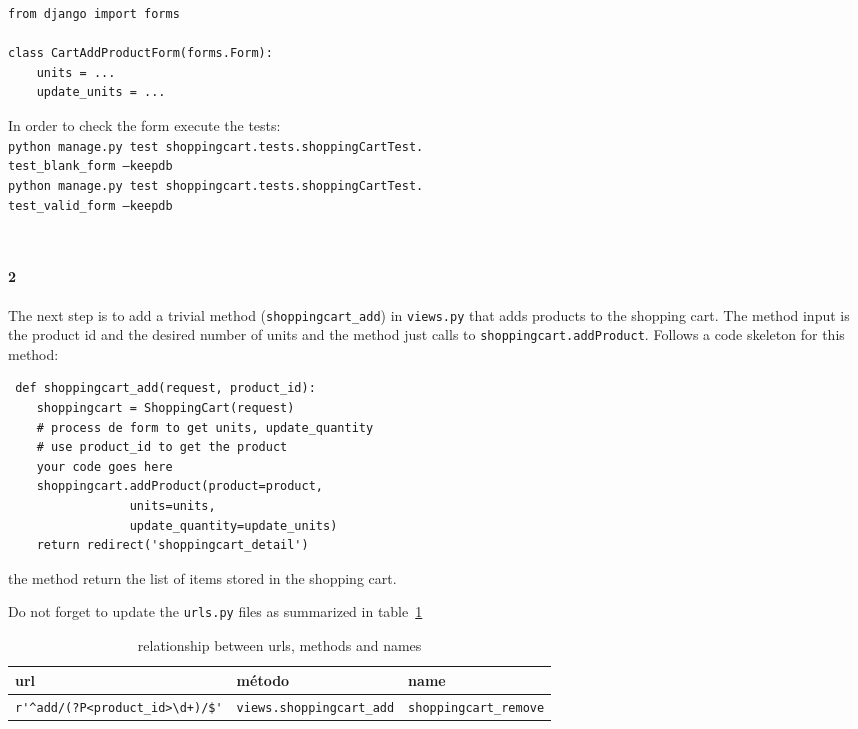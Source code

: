 \documentclass[12pt]{article} %
\newcommand{\ttt}[1]{\texttt{#1}}%
\newcommand{\views}{\texttt{views.py}}%
\newcommand{\urls}{\texttt{urls.py}}%
\begin{document}
\begin{lstlisting}
from django import forms

class CartAddProductForm(forms.Form):
    units = ...
    update_units = ...
\end{lstlisting}

\begin{minipage}{\textwidth}
In order to check the form execute the tests:\\ 
\ttt{python manage.py test shoppingcart.tests.shoppingCartTest.\\test\_blank\_form --keepdb}\\ \ttt{python manage.py test shoppingcart.tests.shoppingCartTest.\\test\_valid\_form --keepdb}
\end{minipage}\\

\paragraph{2} The next step is to add a trivial method (\ttt{shoppingcart\_add}) in \views{} that adds products to the shopping cart. The method input is the product id and the desired number of units and the method just calls to \ttt{shoppingcart.addProduct}. Follows a code skeleton for this method:

\begin{lstlisting}
 def shoppingcart_add(request, product_id):
    shoppingcart = ShoppingCart(request)
    # process de form to get units, update_quantity
    # use product_id to get the product
    your code goes here
    shoppingcart.addProduct(product=product,
                 units=units,
                 update_quantity=update_units)
    return redirect('shoppingcart_detail')

\end{lstlisting}
the method return the list of items stored in the shopping cart.

Do not forget to update the \urls{} files as summarized in  table~\ref{tab:urlsshoppingadd}

\begin{table}[H]
\centering
\begin{tabular}{lll}
    \textbf{url} & \textbf{método} & \textbf{name} \\ \hline
 \verb|r'^add/(?P<product_id>\d+)/$'|  & \verb|views.shoppingcart_add|  & \verb|shoppingcart_remove|\\
\end{tabular}
\caption{relationship between urls, methods and names}
\label{tab:urlsshoppingadd}
\end{table}
\end{document}
